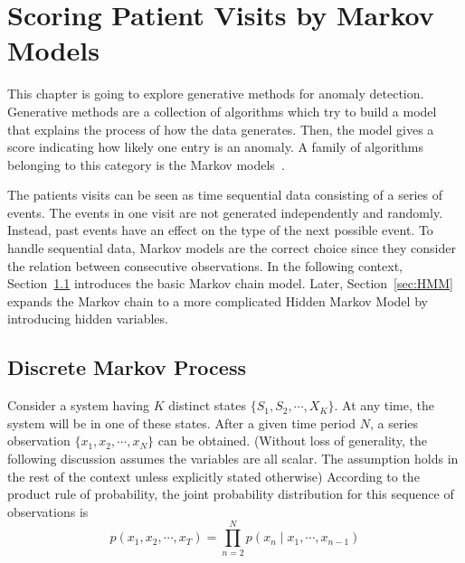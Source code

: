 \chapter{Scoring Patient Visits by Markov Models}
\label{chapter:generative}
This chapter is going to explore generative methods for anomaly detection. Generative methods are a collection of algorithms which try to build a model that explains the process of how the data generates. Then, the model gives a score indicating how likely one entry is an anomaly. A family of algorithms belonging to this category is the Markov models~\cite{isaacson1976markov}.

The patients visits can be seen as time sequential data consisting of a series of events. The events in one visit are not generated independently and randomly. Instead, past events have an effect on the type of the next possible event. To handle sequential data, Markov models are the correct choice since they consider the relation between consecutive observations. In the following context, Section~\ref{sec:MM} introduces the basic Markov chain model. Later, Section~\ref{sec:HMM} expands the Markov chain to a more complicated Hidden Markov Model by introducing hidden variables.

\section{Discrete Markov Process}
\label{sec:MM}
Consider a system having \(K\) distinct states \(\{S_1, S_2, \cdots, X_K\}\). At any time, the system will be in one of these states. After a given time period \(N\), a series observation \(\{x_1, x_2, \cdots, x_N\}\) can be obtained. (Without loss of generality, the following discussion assumes the variables are all scalar. The assumption holds in the rest of the context unless explicitly stated otherwise) According to the product rule of probability, the joint probability distribution for this sequence of observations is
\begin{equation}
	p(x_1, x_2, \cdots, x_T) = \prod_{n = 2}^{N} p(x_n \mid x_1, \cdots, x_{n-1})
\end{equation}


